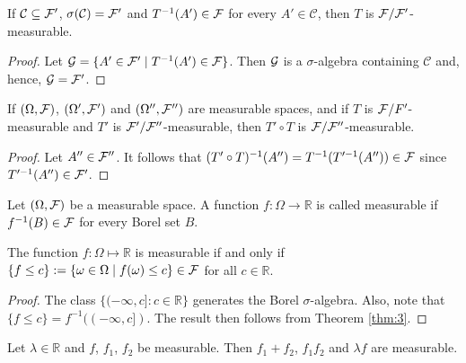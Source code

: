 \begin{theorem}\label{thm:3}
If $\mathcal{C}\subseteq \mathcal F'$, $\sigma(\mathcal{C})=\mathcal F'$ and $T^{-1}(A')\in\mathcal F$ for every $A'\in\mathcal{C}$, then $T$ is $\mathcal F/\mathcal F'$-measurable.
\end{theorem}

\begin{proof}
Let $\mathcal G=\{A'\in\mathcal F'\mid T^{-1}(A')\in\mathcal F \}$. Then $\mathcal G$ is a $\sigma$-algebra containing $\mathcal{C}$ and, hence, $\mathcal G=\mathcal F'$.
\end{proof}


\begin{theorem}
If $(\Omega, \mathcal F)$, $(\Omega', \mathcal F')$ and $(\Omega'', \mathcal F'')$ are measurable spaces, and if $T$ is $\mathcal F/F'$-measurable and $T'$ is $\mathcal F'/\mathcal F''$-measurable, then $T'\circ T$ is $\mathcal F/\mathcal F''$-measurable.
\end{theorem}

\begin{proof}
Let $A''\in \mathcal F''$. It follows that $(T'\circ T)^{-1}(A'')=T^{-1}(T'^{-1}(A''))\in\mathcal F$ since $T'^{-1}(A'')\in\mathcal F'$.
\end{proof}

\begin{definition}
Let $(\Omega, \mathcal F)$ be a measurable space. A function $f:\Omega\to \mathbb{R}$ is called measurable if $f^{-1}(B)\in\mathcal F$ for every Borel set $B$.
\end{definition}

\begin{theorem}
The function $f:\Omega\mapsto \mathbb{R}$ is measurable if and only if $\{f\leq c\}:=\{\omega\in\Omega\mid f(\omega)\leq c \}\in \mathcal F$ for all $c\in \mathbb{R}$.\\
\end{theorem}

\begin{proof}
The class $\{(-\infty, c]: c\in \mathbb{R} \}$ generates the Borel $\sigma$-algebra. Also, note that $\{f\leq c \}=f^{-1}((-\infty, c])$. The result then follows from Theorem \ref{thm:3}.
\end{proof}

\begin{theorem}
Let $\lambda\in\mathbb{R}$ and $f$, $f_1$, $f_2$ be measurable. Then $f_1+f_2$, $f_1f_2$ and $\lambda f$ are measurable.
\end{theorem}

